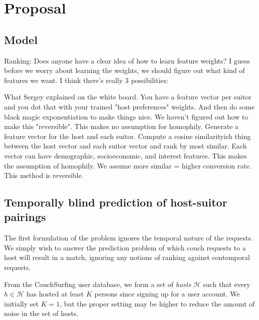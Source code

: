 \documentclass[11pt]{article}
\begin{document}
\section{Proposal}
\subsection{Model}
Ranking:
Does anyone have a clear idea of how to learn feature weights?  I guess before we worry about learning the weights, we should figure out what kind of features we want.  I think there's really 3 possibilities:

What Sergey explained on the white board.  You have a feature vector per suitor and you dot that with your trained "host preferences" weights. And then do some black magic exponentiation to make things nice. We haven't figured out how to make this "reversible".  This makes no assumption for homophily.
Generate a feature vector for the host and each suitor. Compute a cosine similarityish thing between the host vector and each suitor vector and rank by most similar. Each vector can have demographic, socioeconomic, and interest features.  This makes the assumption of homophily. We assume more similar = higher conversion rate. This method is reversible.


\subsection{Temporally blind prediction of host-suitor pairings}
The first formulation of the problem ignores the temporal nature of the requests.
We simply wish to answer the prediction problem of which couch requests to a host will result in a match, ignoring any notions of ranking against contemporal requests.

From the CouchSurfing user database, we form a set of \emph{hosts} $\mathcal{H}$ such that every $h \in \mathcal{H}$ has hosted at least $K$ persons since signing up for a user account.
We initially set $K=1$, but the proper setting may be higher to reduce the amount of noise in the set of hosts.
\end{document}
